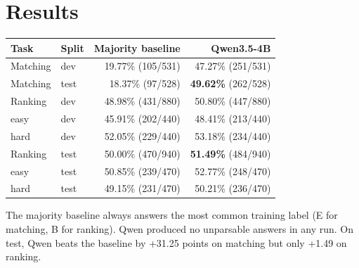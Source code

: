 \documentclass[11pt]{article}
\begin{document}
\section{Results}
\begin{center}
\begin{tabular}{llrr}
\toprule
Task & Split & Majority baseline & Qwen3.5-4B \\
\midrule
Matching & dev  & 19.77\% (105/531) & 47.27\% (251/531) \\
Matching & test & 18.37\% (97/528)  & \textbf{49.62\%} (262/528) \\
\midrule
Ranking  & dev  & 48.98\% (431/880) & 50.80\% (447/880) \\
\quad easy & dev & 45.91\% (202/440) & 48.41\% (213/440) \\
\quad hard & dev & 52.05\% (229/440) & 53.18\% (234/440) \\
Ranking  & test & 50.00\% (470/940) & \textbf{51.49\%} (484/940) \\
\quad easy & test & 50.85\% (239/470) & 52.77\% (248/470) \\
\quad hard & test & 49.15\% (231/470) & 50.21\% (236/470) \\
\bottomrule
\end{tabular}
\end{center}
The majority baseline always answers the most common training label (E for matching, B for ranking).
Qwen produced no unparsable answers in any run. On test, Qwen beats the baseline by
+31.25 points on matching but only +1.49 on ranking.

\end{document}
